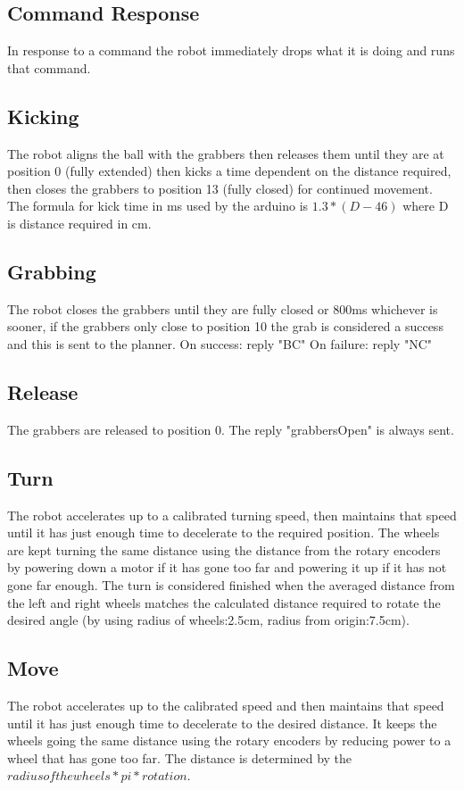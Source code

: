 \subsection{Command Response}
In response to a command the robot immediately drops what it is doing and runs that command. 
\subsection{Kicking}
The robot aligns the ball with the grabbers then releases them until they are at position 0 (fully extended) then kicks a time dependent on the distance required, then closes the grabbers to position 13 (fully closed) for continued movement. The formula for kick time in ms used by the arduino is $ 1.3*(D-46) $ where D is distance required in cm. 
\subsection{Grabbing}
The robot closes the grabbers until they are fully closed or 800ms whichever is sooner, if the grabbers only close to position 10 the grab is considered a success and this is sent to the planner. 
On success: reply "BC"
On failure: reply "NC"
\subsection{Release}
The grabbers are released to position 0. The reply "grabbersOpen" is always sent. 
\subsection{Turn}
The robot accelerates up to a calibrated turning speed, then maintains that speed until it has just enough time to decelerate to the required position. The wheels are kept turning the same distance using the distance from the rotary encoders by powering down a motor if it has gone too far and powering it up if it has not gone far enough. The turn is considered finished when the averaged distance from the left and right wheels matches the calculated distance required to rotate the desired angle (by using radius of wheels:2.5cm, radius from origin:7.5cm). 
\subsection{Move}
The robot accelerates up to the calibrated speed and then maintains that speed until it has just enough time to decelerate to the desired distance. It keeps the wheels going the same distance using the rotary encoders by reducing power to a wheel that has gone too far. The distance is determined by the $ radius of the wheels * pi * rotation $. 

